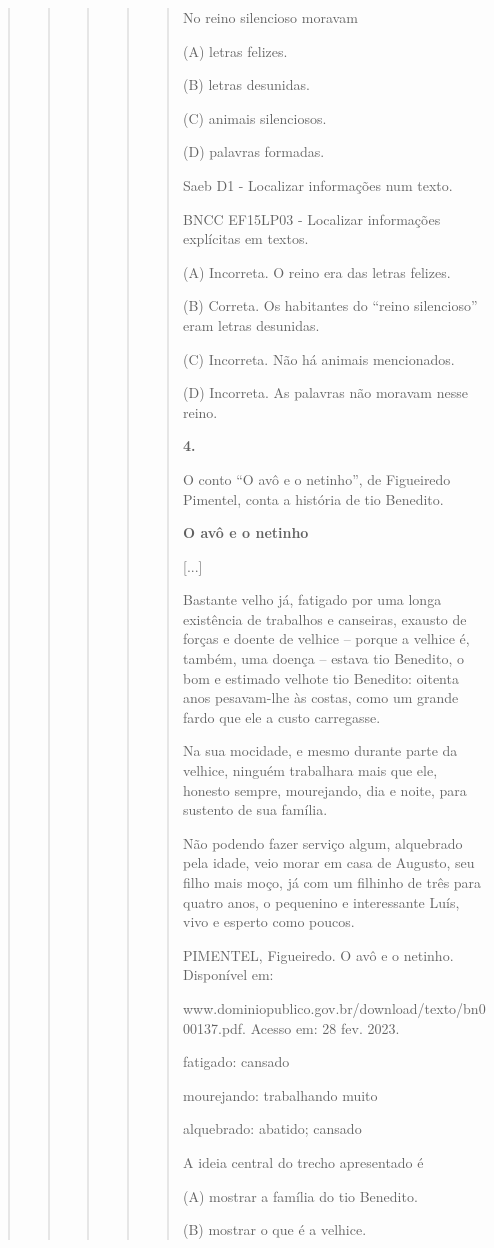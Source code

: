 \begin{quote}
\begin{quote}
\begin{quote}
\begin{quote}
\begin{quote}
No reino silencioso moravam

(A) letras felizes.

(B) letras desunidas.

(C) animais silenciosos.

(D) palavras formadas.

Saeb D1 - Localizar informações num texto.

BNCC EF15LP03 - Localizar informações explícitas em textos.

(A) Incorreta. O reino era das letras felizes.

(B) Correta. Os habitantes do ``reino silencioso'' eram letras
desunidas.

(C) Incorreta. Não há animais mencionados.

(D) Incorreta. As palavras não moravam nesse reino.

\textbf{4.}

O conto ``O avô e o netinho'', de Figueiredo Pimentel, conta a história
de tio Benedito.

\textbf{O avô e o netinho}

{[}...{]}

Bastante velho já, fatigado por uma longa existência de trabalhos e
canseiras, exausto de forças e doente de velhice -- porque a velhice é,
também, uma doença -- estava tio Benedito, o bom e estimado velhote tio
Benedito: oitenta anos pesavam-lhe às costas, como um grande fardo que
ele a custo carregasse.

Na sua mocidade, e mesmo durante parte da velhice, ninguém trabalhara
mais que ele, honesto sempre, mourejando, dia e noite, para sustento de
sua família.

Não podendo fazer serviço algum, alquebrado pela idade, veio morar em
casa de Augusto, seu filho mais moço, já com um filhinho de três para
quatro anos, o pequenino e interessante Luís, vivo e esperto como
poucos.

PIMENTEL, Figueiredo. O avô e o netinho. Disponível em:

www.dominiopublico.gov.br/download/texto/bn000137.pdf. Acesso em: 28
fev. 2023.

fatigado: cansado

mourejando: trabalhando muito

alquebrado: abatido; cansado

A ideia central do trecho apresentado é

(A) mostrar a família do tio Benedito.

(B) mostrar o que é a velhice.


\end{quote}
\end{quote}
\end{quote}
\end{quote}
\end{quote}
